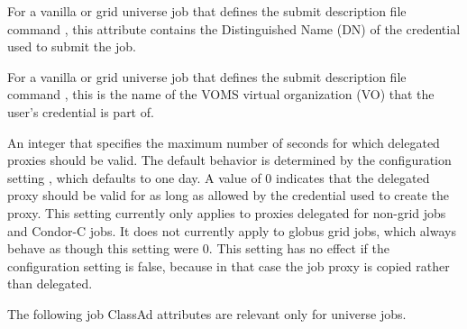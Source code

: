 \begin{description}
\item[\AdAttr{X509UserProxySubject}:]   
For a vanilla or grid universe job that defines the submit description
file command , 
this attribute contains the Distinguished Name (DN) of the credential
used to submit the job.

\item[\AdAttr{X509UserProxyVOName}:]   
For a vanilla or grid universe job that defines the submit description
file command , 
this is the name of the VOMS virtual organization (VO) that 
the user's credential is part of. 

\item[\AdAttr{DelegateJobGSICredentialsLifetime}:]   
An integer that specifies the maximum number of seconds for which
delegated proxies should be valid.  The default behavior is determined
by the configuration
setting , which
defaults to one day.  A value of 0 indicates that the delegated proxy
should be valid for as long as allowed by the credential used to
create the proxy.  This setting currently only applies to proxies
delegated for non-grid jobs and Condor-C jobs.  It does not currently
apply to globus grid jobs, which always behave as though this setting
were 0.  This setting has no effect if the configuration
setting  is false, because in
that case the job proxy is copied rather than delegated.

\end{description}

The following job ClassAd attributes are relevant only for
 universe jobs.

